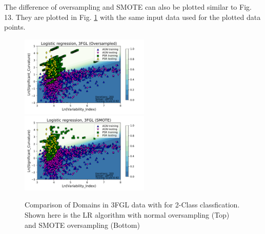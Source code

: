 The difference of oversampling and SMOTE can also be plotted similar to Fig. 13. They are plotted in Fig. \ref{fig:domains_smote_over} with the same input data used for the plotted data points.


\begin{figure}[h]
\centering
\includegraphics[width=0.55\textwidth]{plots/classification_domains/domains_oversampled_LR_3FGL_2class.pdf}
\includegraphics[width=0.55\textwidth]{plots/classification_domains/domains_smote_LR_3FGL_2class.pdf}
\caption{Comparison of Domains in 3FGL data with for 2-Class classfication. Shown here is the LR algorithm with normal oversampling (Top) and SMOTE oversampling (Bottom)
}
\label{fig:domains_smote_over}
\end{figure}
